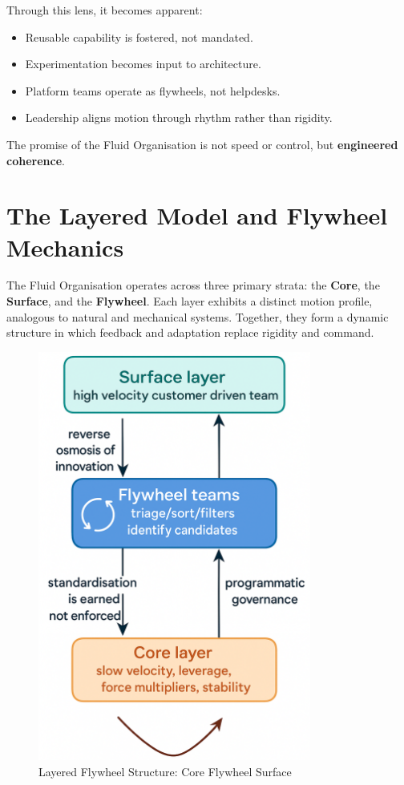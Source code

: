 \documentclass[12pt]{article}
\begin{document}
Through this lens, it becomes apparent:
\begin{itemize}
    \item Reusable capability is fostered, not mandated.
    \item Experimentation becomes input to architecture.
    \item Platform teams operate as flywheels, not helpdesks.
    \item Leadership aligns motion through rhythm rather than rigidity.
\end{itemize}

The promise of the Fluid Organisation is not speed or control, but \textbf{engineered coherence}.

\section{The Layered Model and Flywheel Mechanics}

The Fluid Organisation operates across three primary strata: the \textbf{Core}, the \textbf{Surface}, and the \textbf{Flywheel}. Each layer exhibits a distinct motion profile, analogous to natural and mechanical systems. Together, they form a dynamic structure in which feedback and adaptation replace rigidity and command.

\begin{figure}[H]
  \centering
  \includegraphics[width=0.8\textwidth]{images/org.png}
  \caption{Layered Flywheel Structure: Core \textrightarrow{} Flywheel \textrightarrow{} Surface}
\end{figure}
\end{document}
